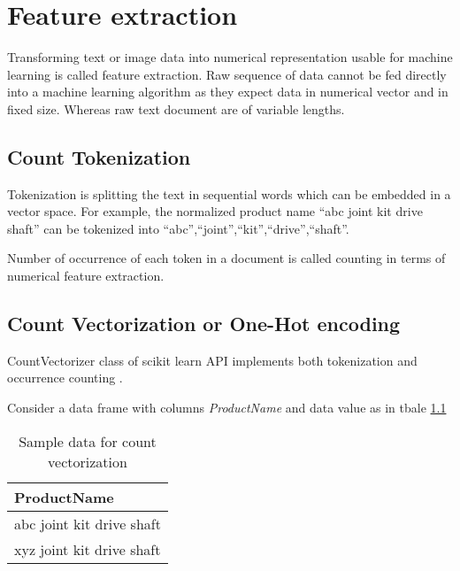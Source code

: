 \chapter{Feature extraction} \label{ch:feature-extraction}

Transforming text or image data into numerical representation usable for machine learning is called feature extraction. Raw sequence of data cannot be fed directly into a machine learning algorithm as they expect data in numerical vector and in fixed size. Whereas raw text document are of variable lengths. 

\section{Count Tokenization}

Tokenization is splitting the text in sequential words which can be embedded in a vector space.
For example, the normalized product name ``abc joint kit drive shaft'' can be tokenized into  ``abc'',``joint'',``kit'',``drive'',``shaft''. 

Number of occurrence of each token in a document is called counting in terms of numerical feature extraction.

\section{Count Vectorization or One-Hot encoding} \label{ch_countvector}


CountVectorizer class of scikit learn API implements both tokenization and occurrence counting \parencite{sklearn_api}. 

Consider a data frame with columns \textit{ProductName} and data value as in tbale \ref{table:count_vectorization}

\begin{table}[h]
    \centering
    \caption{Sample data for count vectorization}
    \label{table:count_vectorization}
    \begin{tabular}{ l }
          \toprule
          
          \textbf{ProductName}\\
          \midrule
          abc joint kit drive shaft\\
          xyz joint kit drive shaft\\
         
          \bottomrule
          \end{tabular}
\end{table}

